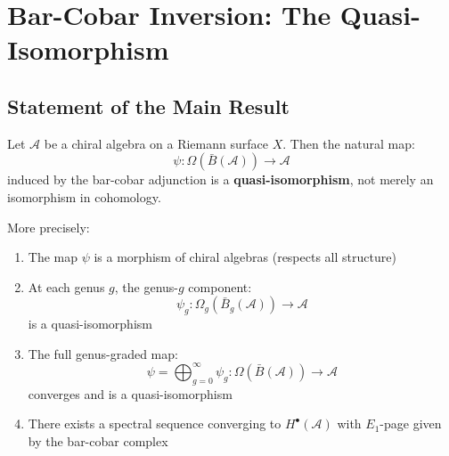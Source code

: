 

\section{Bar-Cobar Inversion: The Quasi-Isomorphism}
\label{sec:bar-cobar-inversion-quasi-iso}

\subsection{Statement of the Main Result}

\begin{theorem}\label{thm:bar-cobar-inversion-qi}
Let $\mathcal{A}$ be a chiral algebra on a Riemann surface $X$. Then the natural map:
$$\psi: \Omega(\bar{B}(\mathcal{A})) \longrightarrow \mathcal{A}$$
induced by the bar-cobar adjunction is a \textbf{quasi-isomorphism}, not merely 
an isomorphism in cohomology.

More precisely:
\begin{enumerate}
\item The map $\psi$ is a morphism of chiral algebras (respects all structure)

\item At each genus $g$, the genus-$g$ component:
      $$\psi_g: \Omega_g(\bar{B}_g(\mathcal{A})) \longrightarrow \mathcal{A}$$
      is a quasi-isomorphism
      
\item The full genus-graded map:
      $$\psi = \bigoplus_{g=0}^\infty \psi_g: \Omega(\bar{B}(\mathcal{A})) \longrightarrow \mathcal{A}$$
      converges and is a quasi-isomorphism
      
\item There exists a spectral sequence converging to $H^\bullet(\mathcal{A})$ 
      with $E_1$-page given by the bar-cobar complex
\end{enumerate}
\end{theorem}

